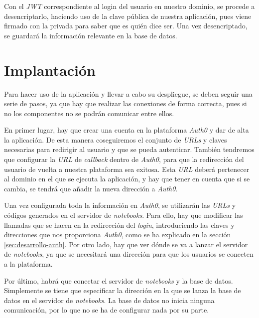 \documentclass[11pt,spanish,listoffigures,listoftables]{tfgetsinf}
\begin{document}
Con el \textit{JWT} correspondiente al login del usuario en nuestro dominio, se procede a desencriptarlo, haciendo uso de la clave pública de nuestra aplicación, pues viene firmado con la privada para saber que es quién dice ser. Una vez desencriptado, se guardará la información relevante en la base de datos.





\chapter{Implantación}
\label{ch:implantacion}

Para hacer uso de la aplicación y llevar a cabo su despliegue, se deben seguir una serie de pasos, ya que hay que realizar las conexiones de forma correcta, pues si no los componentes no se podrán comunicar entre ellos.

En primer lugar, hay que crear una cuenta en la plataforma \textit{Auth0} y dar de alta la aplicación. De esta manera coseguiremos el conjunto de \textit{URLs} y claves necesarias para redirigir al usuario y que se pueda autenticar. También tendremos que configurar la \textit{URL} de \textit{callback} dentro de \textit{Auth0}, para que la redirección  del usuario de vuelta a nuestra plataforma sea exitosa. Esta \textit{URL} deberá pertenecer al dominio en el que se ejecuta la aplicación, y hay que tener en cuenta que si se cambia, se tendrá que añadir la nueva dirección a \textit{Auth0}.

Una vez configurada toda la información en \textit{Auth0}, se utilizarán las \textit{URLs} y códigos generados en el servidor de \textit{notebooks}. Para ello, hay que modificar las llamadas que se hacen en la redirección del \textit{login}, introduciendo las claves y direcciones que nos proporciona \textit{Auth0}, como se ha explicado en la sección \ref{sec:desarrollo-auth}. Por otro lado, hay que ver dónde se va a lanzar el servidor de \textit{notebooks}, ya que se necesitará una dirección para que los usuarios se conecten a la plataforma.

Por último, habrá que conectar el servidor de \textit{notebooks} y la base de datos. Simplemente se tiene que especificar la dirección en la que se lanza la base de datos en el servidor de \textit{notebooks}. La base de datos no inicia ninguna comunicación, por lo que no se ha de configurar nada por su parte. 
\end{document}
